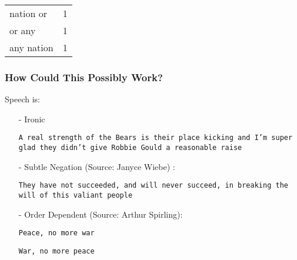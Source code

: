 \documentclass{beamer}
\numberwithin{equation}{section}
\begin{document}
\begin{frame}
{\begin{tabular}{ll}
nation or & 1  \\
or any & 1   \\
any nation & 1
\end{tabular}}


\pause \pause \pause


\end{frame}




\begin{frame}
\frametitle{How Could This Possibly Work?}


Speech is:
\begin{itemize}
\item[-] Ironic
\item[] {\tt A real strength of the Bears is their place kicking and I'm super glad they didn't give Robbie Gould a reasonable raise }
\item[-] Subtle Negation (Source: Janyce Wiebe) :
\item[] {\tt They have not succeeded, and will never succeed, in breaking the will of this valiant people}
\item[-] Order Dependent (Source: Arthur Spirling):
\item[]{\tt Peace, no more war}
\item[]{\tt War, no more peace}
\end{itemize}


\end{frame}
\end{document}
